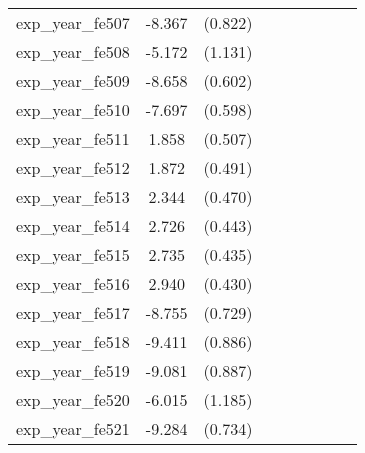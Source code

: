 {\begin{tabular}{l*{4}{cc}}
exp\_year\_fe507&   -8.367\sym{***}&  (0.822)&                  &         &                  &         &                  &         \\
exp\_year\_fe508&   -5.172\sym{***}&  (1.131)&                  &         &                  &         &                  &         \\
exp\_year\_fe509&   -8.658\sym{***}&  (0.602)&                  &         &                  &         &                  &         \\
exp\_year\_fe510&   -7.697\sym{***}&  (0.598)&                  &         &                  &         &                  &         \\
exp\_year\_fe511&    1.858\sym{***}&  (0.507)&                  &         &                  &         &                  &         \\
exp\_year\_fe512&    1.872\sym{***}&  (0.491)&                  &         &                  &         &                  &         \\
exp\_year\_fe513&    2.344\sym{***}&  (0.470)&                  &         &                  &         &                  &         \\
exp\_year\_fe514&    2.726\sym{***}&  (0.443)&                  &         &                  &         &                  &         \\
exp\_year\_fe515&    2.735\sym{***}&  (0.435)&                  &         &                  &         &                  &         \\
exp\_year\_fe516&    2.940\sym{***}&  (0.430)&                  &         &                  &         &                  &         \\
exp\_year\_fe517&   -8.755\sym{***}&  (0.729)&                  &         &                  &         &                  &         \\
exp\_year\_fe518&   -9.411\sym{***}&  (0.886)&                  &         &                  &         &                  &         \\
exp\_year\_fe519&   -9.081\sym{***}&  (0.887)&                  &         &                  &         &                  &         \\
exp\_year\_fe520&   -6.015\sym{***}&  (1.185)&                  &         &                  &         &                  &         \\
exp\_year\_fe521&   -9.284\sym{***}&  (0.734)&                  &         &                  &         &                  &         \\

\end{tabular}}
